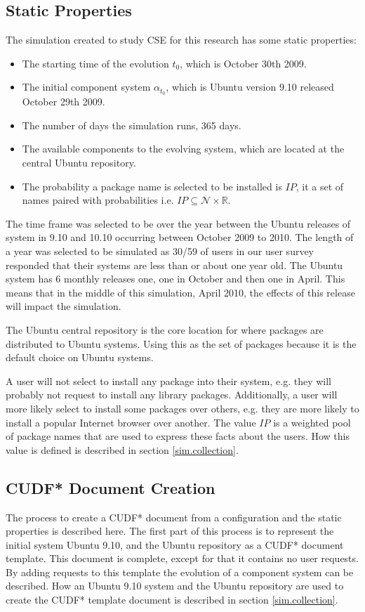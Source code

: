 \subsection{Static Properties}
The simulation created to study CSE for this research has some static properties:
\begin{itemize}
  \item The starting time of the evolution $t_0$, which is October 30th 2009.
  \item The initial component system $\alpha_{t_0}$, which is Ubuntu version 9.10 released October 29th 2009.
  \item The number of days the simulation runs, 365 days.
  \item The available components to the evolving system, which are located at the central Ubuntu repository.
  \item The probability a package name is selected to be installed is $IP$, it a set of names paired with probabilities i.e. $IP \subseteq \mathcal{N} \times \mathbb{R}$.
\end{itemize}

The time frame was selected to be over the year between the Ubuntu releases of system in 9.10 and 10.10 occurring between October 2009 to 2010.
The length of a year was selected to be simulated as 30/59 of users in our user survey responded that their systems are less than or about one year old.
The Ubuntu system has 6 monthly releases one, one in October and then one in April.
This means that in the middle of this simulation, April 2010, the effects of this release will impact the simulation.

The Ubuntu central repository is the core location for where packages are distributed to Ubuntu systems.
Using this as the set of packages because it is the default choice on Ubuntu systems.

A user will not select to install any package into their system, e.g. they will probably not request to install any library packages.
Additionally, a user will more likely select to install some packages over others, e.g. they are more likely to install a popular Internet browser over another.
The value $IP$ is a weighted pool of package names that are used to express these facts about the users.
How this value is defined is described in section \ref{sim.collection}.

\subsection{CUDF* Document Creation}
The process to create a CUDF* document from a configuration and the static properties is described here.
The first part of this process is to represent the initial system Ubuntu 9.10, and the Ubuntu repository as a CUDF* document template.
This document is complete, except for that it contains no user requests.
By adding requests to this template the evolution of a component system can be described.
How an Ubuntu 9.10 system and the Ubuntu repository are used to create the CUDF* template document is described in section \ref{sim.collection}.

